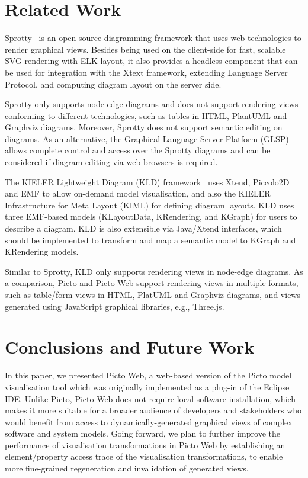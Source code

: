 \documentclass[sigconf,review]{acmart}
\begin{document}
\section{Related Work}
Sprotty~\cite{sprotty2022git} is an open-source diagramming framework that uses web technologies to render graphical views. 
Besides being used on the client-side for fast, scalable SVG rendering with ELK layout, it also provides a headless component that can be used for integration with the Xtext framework, extending Language Server Protocol, and computing diagram layout on the server side. 

Sprotty only supports node-edge diagrams and does not support rendering views conforming to different technologies, such as tables in HTML, PlantUML and Graphviz diagrams. Moreover, Sprotty does not support semantic editing on diagrams. As an alternative, the Graphical Language Server Platform (GLSP)~\cite{eclipse2022glsp} allows complete control and access over the Sprotty diagrams and can be considered if diagram editing via web browsers is required.

The KIELER Lightweight Diagram (KLD) framework~\cite{schneider2013just} uses Xtend, Piccolo2D and EMF to allow on-demand model visualisation, and also the KIELER Infrastructure for Meta Layout (KIML) for defining diagram layouts. KLD uses three EMF-based models (KLayoutData, KRendering, and KGraph) for users to describe a diagram. KLD is also extensible via Java/Xtend interfaces, which should be implemented to transform and map a semantic model to KGraph and KRendering models.

Similar to Sprotty, KLD only supports rendering views in node-edge diagrams. As a comparison, Picto and Picto Web support rendering views in multiple formats, such as table/form views in HTML, PlatUML and Graphviz diagrams, and views generated using JavaScript graphical libraries, e.g., Three.js.


\section{Conclusions and Future Work}
\label{sec:conclusions_and_future_work}

In this paper, we presented Picto Web, a web-based version of the Picto model visualisation tool which was originally implemented as a plug-in of the Eclipse IDE. Unlike Picto, Picto Web does not require local software installation, which makes it more suitable for a broader audience of developers and stakeholders who would benefit from access to dynamically-generated graphical views of complex software and system models. Going forward, we plan to further improve the performance of visualisation transformations in Picto Web by establishing an element/property access trace of the visualisation transformations, to enable more fine-grained regeneration and invalidation of generated views.
\end{document}
